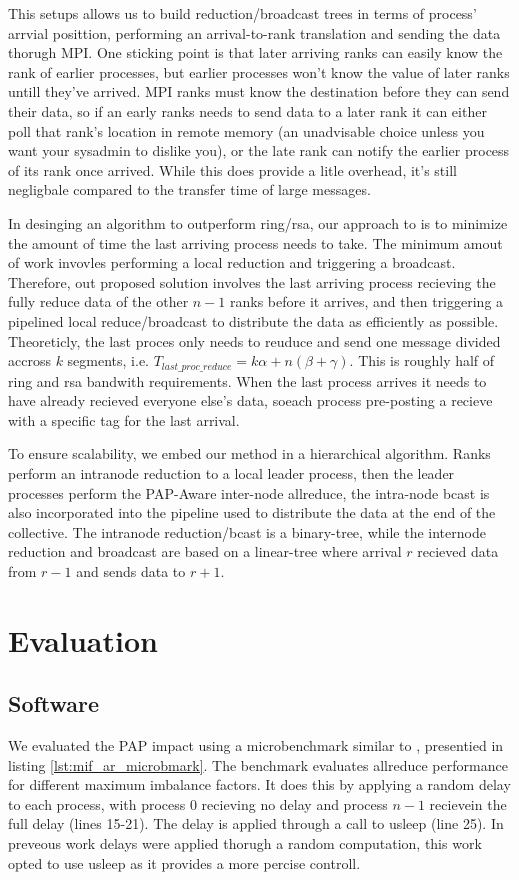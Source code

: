 This setups allows us to build reduction/broadcast trees in terms of process' arrvial posittion, performing an arrival-to-rank translation and sending the data thorugh MPI.
One sticking point is that later arriving ranks can easily know the rank of earlier processes, but earlier processes won't know the value of later ranks untill they've arrived.
MPI ranks must know the destination before they can send their data, so if an early ranks needs to send data to a later rank it can either poll that rank's location in remote memory (an unadvisable choice unless you want your sysadmin to dislike you), or the late rank can notify the earlier process of its rank once arrived.
While this does provide a litle overhead, it's still negligbale compared to the transfer time of large messages.

In desinging an algorithm to outperform ring/rsa, our approach to is to minimize the amount of time the last arriving process needs to take.
The minimum amout of work invovles performing a local reduction and triggering a broadcast.
Therefore, out proposed solution involves the last arriving process recieving the fully reduce data of the other $n-1$ ranks before it arrives, and then triggering a pipelined local reduce/broadcast to distribute the data as efficiently as possible. 
Theoreticly, the last proces only needs to reuduce and send one message divided accross $k$ segments, i.e. $T_{last\_proc\_reduce}=k\alpha+n(\beta+\gamma)$.
This is roughly half of ring and rsa bandwith requirements.
When the last process arrives it needs to have already recieved everyone else's data, soeach process pre-posting a recieve with a specific tag for the last arrival.

To ensure scalability, we embed our method in a hierarchical algorithm. 
Ranks perform an intranode reduction to a local leader process, then the leader processes perform the PAP-Aware inter-node allreduce, the intra-node bcast is also incorporated into the pipeline used to distribute the data at the end of the collective. 
The intranode reduction/bcast is a binary-tree, while the internode reduction and broadcast are based on a linear-tree where arrival $r$ recieved data from $r-1$ and sends data to $r+1$.


\section{Evaluation}

\subsection{Software}
We evaluated the PAP impact using a microbenchmark similar to \cite{Faraj2008StudyProcArrivalMPIColl}, presentied in listing \ref{lst:mif_ar_microbmark}.
The benchmark evaluates allreduce performance for different maximum imbalance factors. 
It does this by applying a random delay to each process, with process 0 recieving no delay and process $n-1$ recievein the full delay (lines 15-21).
The delay is applied through a call to usleep (line 25).
In preveous work \cite{Faraj2008StudyProcArrivalMPIColl, Alizadeh2022PAPCollDL} delays were applied thorugh a random computation, this work opted to use usleep as it provides a more percise controll.


